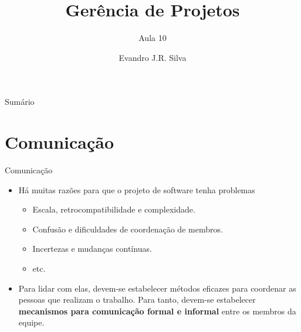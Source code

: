 \documentclass{beamer}
\title[GP 10]{Gerência de Projetos}
\subtitle{Aula 10}
\author[E.J.R. Silva]{Evandro J.R. Silva}
\date{}
\begin{document}
    
\begin{frame}
    \titlepage
\end{frame}

\begin{frame}{Sumário}
    \tableofcontents
\end{frame}

\section{Comunicação}


\begin{frame}{Comunicação}
    \begin{itemize}
        \justifying
        \item Há muitas razões para que o projeto de software tenha problemas
        	\begin{itemize}
        		\justifying
        		\item Escala, retrocompatibilidade e complexidade.
        		\item Confusão e dificuldades de coordenação de membros.
        		\item Incertezas e mudanças contínuas.
        		\item etc.
        	\end{itemize}
        \item<2> Para lidar com elas, devem-se estabelecer métodos eficazes para coordenar as pessoas que realizam o trabalho. Para tanto, devem-se estabelecer \textbf{mecanismos para comunicação formal e informal} entre os membros da equipe.
    \end{itemize}
\end{frame}
\end{document}
